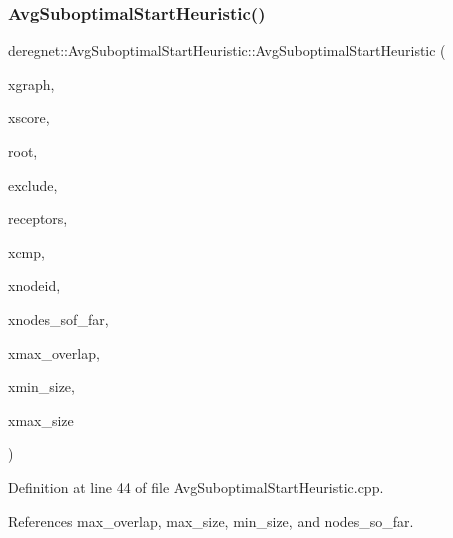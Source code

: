 \subsubsection{\texorpdfstring{Avg\+Suboptimal\+Start\+Heuristic()}{AvgSuboptimalStartHeuristic()}}
{\footnotesize\ttfamily deregnet\+::\+Avg\+Suboptimal\+Start\+Heuristic\+::\+Avg\+Suboptimal\+Start\+Heuristic (\begin{DoxyParamCaption}\item[{\hyperlink{namespacederegnet_a55b76c55bbabc682cbc61f8b9948799e}{Graph} $\ast$}]{xgraph,  }\item[{\hyperlink{namespacederegnet_ae102b707ae1d6f83c639ece5e0dd5658}{Node\+Map}$<$ double $>$ $\ast$}]{xscore,  }\item[{\hyperlink{namespacederegnet_a744bad34f2de9856d36715a445f027f3}{Node} $\ast$}]{root,  }\item[{std\+::set$<$ \hyperlink{namespacederegnet_a744bad34f2de9856d36715a445f027f3}{Node} $>$ $\ast$}]{exclude,  }\item[{std\+::set$<$ \hyperlink{namespacederegnet_a744bad34f2de9856d36715a445f027f3}{Node} $>$ $\ast$}]{receptors,  }\item[{std\+::function$<$ bool(double, double)$>$}]{xcmp,  }\item[{\hyperlink{namespacederegnet_ae102b707ae1d6f83c639ece5e0dd5658}{Node\+Map}$<$ std\+::string $>$ $\ast$}]{xnodeid,  }\item[{std\+::set$<$ std\+::string $>$ $\ast$}]{xnodes\+\_\+sof\+\_\+far,  }\item[{double}]{xmax\+\_\+overlap,  }\item[{int}]{xmin\+\_\+size,  }\item[{int}]{xmax\+\_\+size }\end{DoxyParamCaption})}



Definition at line 44 of file Avg\+Suboptimal\+Start\+Heuristic.\+cpp.



References max\+\_\+overlap, max\+\_\+size, min\+\_\+size, and nodes\+\_\+so\+\_\+far.


